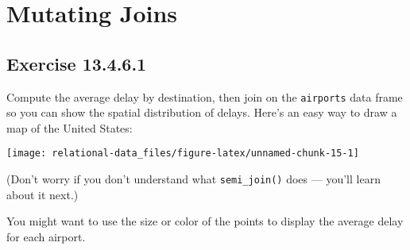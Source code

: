 \documentclass[]{book}
\newenvironment{Shaded}{\begin{snugshade}}{\end{snugshade}}
\newcommand{\KeywordTok}[1]{\textcolor[rgb]{0.13,0.29,0.53}{\textbf{#1}}}
\newcommand{\NormalTok}[1]{#1}
\newcommand{\OperatorTok}[1]{\textcolor[rgb]{0.81,0.36,0.00}{\textbf{#1}}}
\newcommand{\StringTok}[1]{\textcolor[rgb]{0.31,0.60,0.02}{#1}}
\theoremstyle{plain}
\theoremstyle{remark}
\begin{document}
\hypertarget{mutating-joins}{%
\section{Mutating Joins}\label{mutating-joins}}

\begin{Shaded}
\end{Shaded}

\hypertarget{exercise-13.4.6.1}{%
\subsection*{\texorpdfstring{Exercise
{13.4.6.1}}{Exercise 13.4.6.1}}\label{exercise-13.4.6.1}}

Compute the average delay by destination, then join on the
\texttt{airports} data frame so you can show the spatial distribution of
delays. Here's an easy way to draw a map of the United States:

\begin{Shaded}
\end{Shaded}

\begin{center}\texttt{[image: relational-data\_files/figure-latex/unnamed-chunk-15-1]} \end{center}

(Don't worry if you don't understand what \texttt{semi\_join()} does ---
you'll learn about it next.)

You might want to use the size or color of the points to display the
average delay for each airport.
\end{document}

